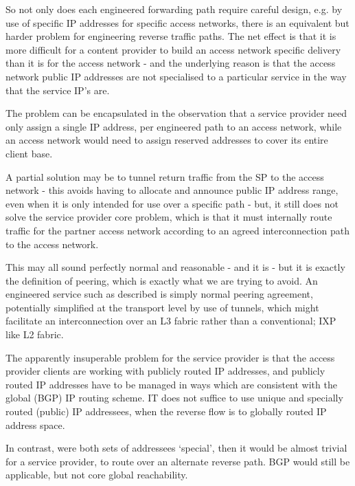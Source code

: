 So not only does each engineered forwarding path require careful design, e.g. by use of specific IP addresses for specific access networks, there is an equivalent but harder problem for engineering reverse traffic paths.  The net effect is that it is more difficult for a content provider to build an access network specific delivery than it is for the access network - and the underlying reason is that the access network public IP addresses are not specialised to a particular service in the way that the service IP's are.

The problem can be encapsulated in the observation that a service provider need only assign a single IP address, per engineered path to an access network, while an access network would need to assign reserved addresses to cover its entire client base.

A partial solution may be to tunnel return traffic from the SP to the access network - this avoids having to allocate and announce public IP address range, even when it is only intended for use over a specific path - but, it still does not solve the service provider core problem, which is that it must internally route traffic for the partner access network according to an agreed interconnection path to the access network.

This may all sound perfectly normal and reasonable - and it is - but it is exactly the definition of peering, which is exactly what we are trying to avoid.  An engineered service such as described is simply normal peering agreement, potentially simplified at the transport level by use of tunnels, which might facilitate an interconnection over an L3 fabric rather than a conventional; IXP like L2 fabric.

The apparently insuperable problem for the service provider is that the access provider clients are working with publicly routed IP addresses, and publicly routed IP addresses have to be managed in ways which are consistent with the global (BGP) IP routing scheme.  IT does not suffice to use unique and specially routed (public) IP addressees, when the reverse flow is to globally routed IP address space.

In contrast, were both sets of addressees `special', then it would be almost trivial for a service provider, to route over an alternate reverse path.  BGP would still be applicable, but not core global reachability.


